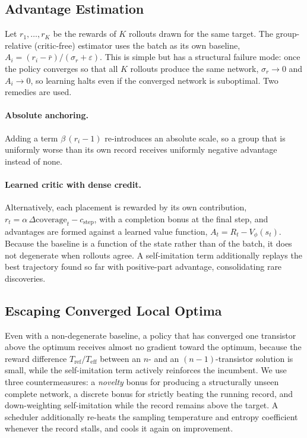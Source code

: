 \documentclass[11pt, a4paper]{article}
\theoremstyle{plain}
\theoremstyle{definition}
\theoremstyle{remark}
\begin{document}
\subsection{Advantage Estimation}

Let $r_1,\dots,r_K$ be the rewards of $K$ rollouts drawn for the same
target.  The group-relative (critic-free) estimator uses the batch as its
own baseline,
$A_i = (r_i - \bar r)/(\sigma_r + \varepsilon)$.
This is simple but has a structural failure mode: once the policy
converges so that all $K$ rollouts produce the same network,
$\sigma_r \to 0$ and $A_i \to 0$, so learning halts even if the converged
network is suboptimal.  Two remedies are used.

\paragraph{Absolute anchoring.}
Adding a term $\beta\,(r_i - 1)$ re-introduces an absolute scale, so a
group that is uniformly worse than its own record receives uniformly
negative advantage instead of none.

\paragraph{Learned critic with dense credit.}
Alternatively, each placement is rewarded by its own contribution,
$r_t = \alpha\,\Delta\text{coverage}_t - c_{\mathrm{step}}$, with a
completion bonus at the final step, and advantages are formed against a
learned value function, $A_t = R_t - V_\phi(s_t)$.  Because the baseline
is a function of the state rather than of the batch, it does not
degenerate when rollouts agree.  A self-imitation term additionally
replays the best trajectory found so far with positive-part advantage,
consolidating rare discoveries.

\subsection{Escaping Converged Local Optima}
\label{sec:escape}

Even with a non-degenerate baseline, a policy that has converged one
transistor above the optimum receives almost no gradient toward the
optimum, because the reward difference $T_{\mathrm{ref}}/T_{\mathrm{eff}}$
between an $n$- and an $(n{-}1)$-transistor solution is small, while the
self-imitation term actively reinforces the incumbent.  We use three
countermeasures: a \emph{novelty} bonus for producing a structurally
unseen complete network, a discrete bonus for strictly beating the
running record, and down-weighting self-imitation while the record
remains above the target.  A scheduler additionally re-heats the sampling
temperature and entropy coefficient whenever the record stalls, and cools
it again on improvement.
\end{document}

